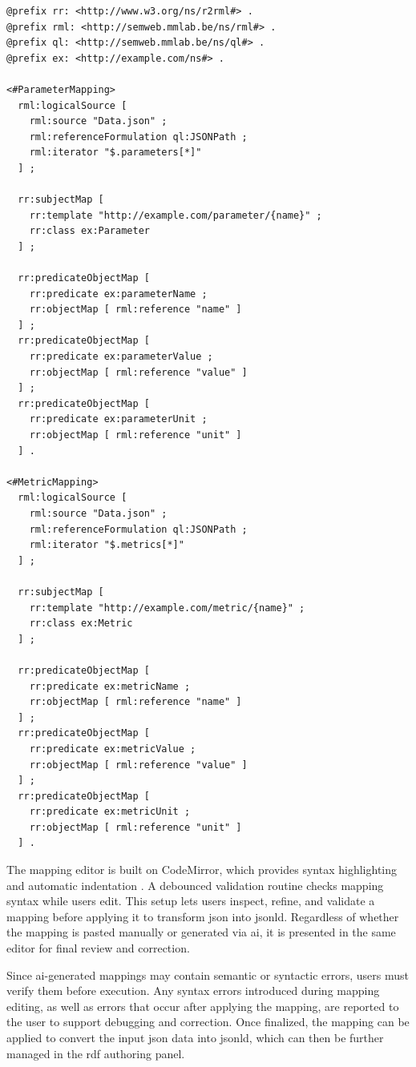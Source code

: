 \begin{lstlisting}[float=htbp,style=turtle, caption={RML mapping which converts JSON data in Listing~\ref{lst:background_json_example} to JSON-LD in Listing~\ref{lst:background_jsonld_example_simple}}, label={lst:background_rml_mapping_simple}]
@prefix rr: <http://www.w3.org/ns/r2rml#> .
@prefix rml: <http://semweb.mmlab.be/ns/rml#> .
@prefix ql: <http://semweb.mmlab.be/ns/ql#> .
@prefix ex: <http://example.com/ns#> .

<#ParameterMapping>
  rml:logicalSource [
    rml:source "Data.json" ;
    rml:referenceFormulation ql:JSONPath ;
    rml:iterator "$.parameters[*]"
  ] ;

  rr:subjectMap [
    rr:template "http://example.com/parameter/{name}" ;
    rr:class ex:Parameter
  ] ;

  rr:predicateObjectMap [
    rr:predicate ex:parameterName ;
    rr:objectMap [ rml:reference "name" ]
  ] ;
  rr:predicateObjectMap [
    rr:predicate ex:parameterValue ;
    rr:objectMap [ rml:reference "value" ]
  ] ;
  rr:predicateObjectMap [
    rr:predicate ex:parameterUnit ;
    rr:objectMap [ rml:reference "unit" ]
  ] .

<#MetricMapping>
  rml:logicalSource [
    rml:source "Data.json" ;
    rml:referenceFormulation ql:JSONPath ;
    rml:iterator "$.metrics[*]"
  ] ;

  rr:subjectMap [
    rr:template "http://example.com/metric/{name}" ;
    rr:class ex:Metric
  ] ;

  rr:predicateObjectMap [
    rr:predicate ex:metricName ;
    rr:objectMap [ rml:reference "name" ]
  ] ;
  rr:predicateObjectMap [
    rr:predicate ex:metricValue ;
    rr:objectMap [ rml:reference "value" ]
  ] ;
  rr:predicateObjectMap [
    rr:predicate ex:metricUnit ;
    rr:objectMap [ rml:reference "unit" ]
  ] .
\end{lstlisting}

The mapping editor is built on CodeMirror, which provides syntax highlighting and automatic indentation \cite{codemirror}. A debounced validation routine checks mapping syntax while users edit. This setup lets users inspect, refine, and validate a mapping before applying it to transform \gls{json} into \gls{jsonld}. Regardless of whether the mapping is pasted manually or generated via \gls{ai}, it is presented in the same editor for final review and correction.

Since \gls{ai}-generated mappings may contain semantic or syntactic errors, users must verify them before execution. Any syntax errors introduced during mapping editing, as well as errors that occur after applying the mapping, are reported to the user to support debugging and correction. Once finalized, the mapping can be applied to convert the input \gls{json} data into \gls{jsonld}, which can then be further managed in the \gls{rdf} authoring panel.

